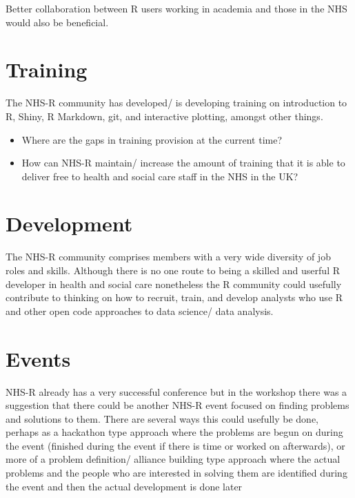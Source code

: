 \documentclass[
]{book}
\providecommand{\tightlist}{%
  \setlength{\itemsep}{0pt}\setlength{\parskip}{0pt}}
\begin{document}
Better collaboration between R users working in academia and those in the NHS would also be beneficial.

\hypertarget{training}{%
\section{Training}\label{training}}

The NHS-R community has developed/ is developing training on introduction to R, Shiny, R Markdown, git, and interactive plotting, amongst other things.

\begin{itemize}
\tightlist
\item
  Where are the gaps in training provision at the current time?
\item
  How can NHS-R maintain/ increase the amount of training that it is able to deliver free to health and social care staff in the NHS in the UK?
\end{itemize}

\hypertarget{development}{%
\section{Development}\label{development}}

The NHS-R community comprises members with a very wide diversity of job roles and skills. Although there is no one route to being a skilled and userful R developer in health and social care nonetheless the R community could usefully contribute to thinking on how to recruit, train, and develop analysts who use R and other open code approaches to data science/ data analysis.

\hypertarget{events}{%
\section{Events}\label{events}}

NHS-R already has a very successful conference but in the workshop there was a suggestion that there could be another NHS-R event focused on finding problems and solutions to them. There are several ways this could usefully be done, perhaps as a hackathon type approach where the problems are begun on during the event (finished during the event if there is time or worked on afterwards), or more of a problem definition/ alliance building type approach where the actual problems and the people who are interested in solving them are identified during the event and then the actual development is done later
\end{document}
